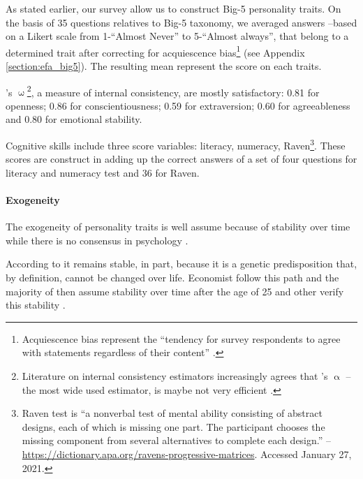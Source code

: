 \documentclass[a4paper, 11pt, onecolumn]{article}
\begin{document}
As stated earlier, our survey allow us to construct Big-5 personality traits.
On the basis of 35 questions relatives to Big-5 taxonomy, we averaged answers --based on a  Likert scale from 1-``Almost Never'' to 5-``Almost always'', that belong to a determined trait after correcting for acquiescence bias\footnote{Acquiescence bias represent the ``tendency for survey respondents to agree with statements regardless of their content'' \citep{Lavrakas2008}.} (see Appendix \ref{section:efa_big5}).
The resulting mean represent the score on each traits.

\citeauthor{McDonald1999}'s $\upomega$\footnote{Literature on internal consistency estimators increasingly agrees that \citeauthor{Cronbach1951}'s $\upalpha$ --the most wide used estimator, is maybe not very efficient \citep{Bourque2019, TrizanoHermosilla2016}.}, a measure of internal consistency, are mostly satisfactory: 0.81 for openness; 0.86 for conscientiousness; 0.59 for extraversion; 0.60 for agreeableness and 0.80 for emotional stability.

Cognitive skills include three score variables: literacy, numeracy, Raven\footnote{Raven test is ``a nonverbal test of mental ability consisting of abstract designs, each of which is missing one part. The participant chooses the missing component from several alternatives to complete each design.'' -- \url{https://dictionary.apa.org/ravens-progressive-matrices}. Accessed January 27, 2021.}.
These scores are construct in adding up the correct answers of a set of four questions for literacy and numeracy test and 36 for Raven.

\paragraph{Exogeneity}
The exogeneity of personality traits is well assume because of stability over time while there is no consensus in psychology \citep{Ardelt2000}.

According to \cite{Costa1997, McCrae2000} it remains stable, in part, because it is a genetic predisposition that, by definition, cannot be changed over life.
Economist follow this path and the majority of then assume stability over time after the age of 25 and other verify this stability \citep{CobbClark2011}. 
\end{document}
